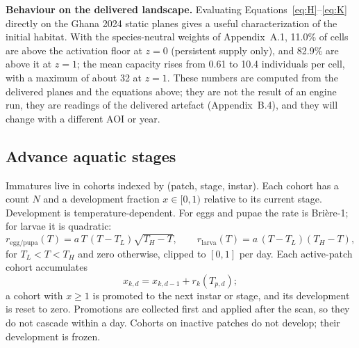 \documentclass[11pt,a4paper]{article}
\begin{document}
\textbf{Behaviour on the delivered landscape.} Evaluating
Equations~\eqref{eq:H}--\eqref{eq:K} directly on the Ghana 2024 static
planes gives a useful characterization of the initial habitat. With the
species-neutral weights of Appendix~A.1, 11.0\% of cells are above the
 activation floor at $z=0$
(persistent supply only), and 82.9\% are
above it at $z=1$; the mean capacity rises from 0.61 to 10.4 individuals
per cell, with a maximum of about 32 at $z=1$. These numbers are computed
from the delivered planes and the equations above; they are not the
result of an engine run, they are readings of the delivered artefact
(Appendix~B.4), and they will change with a different AOI
or year.

\subsection{Advance aquatic stages}

Immatures live in cohorts indexed by (patch, stage, instar). Each cohort
has a count $N$ and a development fraction $x\in[0,1)$ relative to its
current stage. Development is temperature-dependent. For eggs and pupae
the rate is Brière-1; for larvae it is quadratic:
\begin{equation}\label{eq:thermal}
r_{\text{egg/pupa}}(T)=a\,T\,(T-T_L)\sqrt{T_H-T},\qquad
r_{\text{larva}}(T)=a\,(T-T_L)(T_H-T),
\end{equation}
for $T_L<T<T_H$ and zero otherwise, clipped to $[0,1]$ per day. Each
active-patch cohort accumulates
\begin{equation}\label{eq:dev}
x_{k,d}=x_{k,d-1}+r_k(T_{p,d});
\end{equation}
a cohort with $x\ge1$ is promoted to the next instar or stage, and its
development is reset to zero. Promotions are collected first and applied
after the scan, so they do not cascade within a day. Cohorts on inactive
patches do not develop; their development is frozen.
\end{document}
